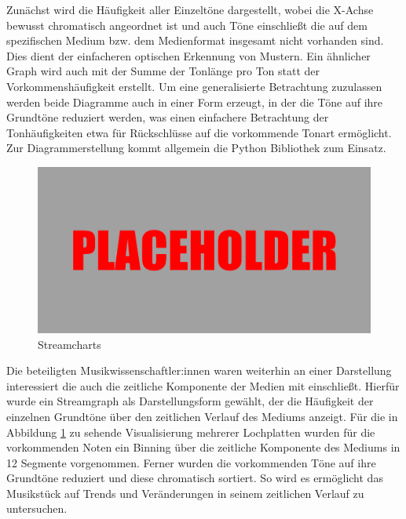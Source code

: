 Zunächst wird die Häufigkeit aller Einzeltöne dargestellt, wobei die X-Achse bewusst chromatisch angeordnet ist und auch Töne einschließt die auf dem spezifischen Medium bzw. dem Medienformat insgesamt nicht vorhanden sind.
Dies dient der einfacheren optischen Erkennung von Mustern.
Ein ähnlicher Graph wird auch mit der Summe der Tonlänge pro Ton statt der Vorkommenshäufigkeit erstellt.
Um eine generalisierte Betrachtung zuzulassen werden beide Diagramme auch in einer Form erzeugt, in der die Töne auf ihre Grundtöne reduziert werden, was einen einfachere Betrachtung der Tonhäufigkeiten etwa für Rückschlüsse auf die vorkommende Tonart ermöglicht.
Zur Diagrammerstellung kommt allgemein die Python Bibliothek  \parencite[]{Hunter_2007} zum Einsatz.

\begin{figure}[t]
    \centering
    \includegraphics[width=\textwidth]{graphics/placeholder.png}
    \caption{Streamcharts}
    \label{streamcharts}
\end{figure}

Die beteiligten Musikwissenschaftler:innen waren weiterhin an einer Darstellung interessiert die auch die zeitliche Komponente der Medien mit einschließt.
Hierfür wurde ein Streamgraph als Darstellungsform gewählt, der die Häufigkeit der einzelnen Grundtöne über den zeitlichen Verlauf des Mediums anzeigt.
Für die in Abbildung \ref{streamcharts} zu sehende Visualisierung mehrerer Lochplatten wurden für die vorkommenden Noten ein Binning über die zeitliche Komponente des Mediums in 12 Segmente vorgenommen.
Ferner wurden die vorkommenden Töne auf ihre Grundtöne reduziert und diese chromatisch sortiert.
So wird es ermöglicht das Musikstück auf Trends und Veränderungen in seinem zeitlichen Verlauf zu untersuchen.

